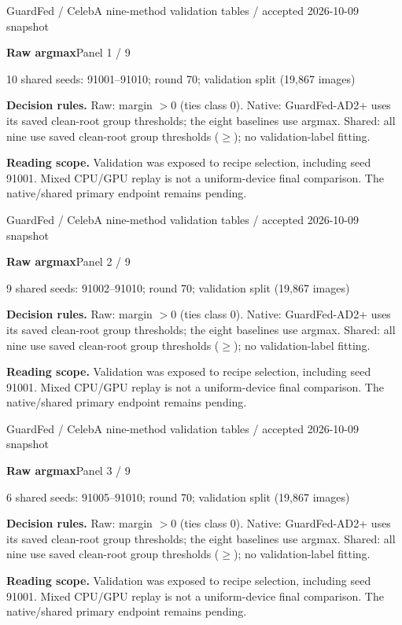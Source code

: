 \documentclass[11pt]{article}
\begin{document}
{\small GuardFed / CelebA nine-method validation tables / accepted 2026-10-09 snapshot}\par\medskip
{\LARGE\bfseries Raw argmax}\hfill{\large Panel 1 / 9}\par\smallskip
{\large 10 shared seeds: 91001--91010; round 70; validation split (19,867 images)}\par\medskip

\par\medskip
{\footnotesize\textbf{Decision rules.} Raw: margin $>0$ (ties class 0). Native: GuardFed-AD2+ uses its saved clean-root group thresholds; the eight baselines use argmax. Shared: all nine use saved clean-root group thresholds ($\geq$); no validation-label fitting.\par
\textbf{Reading scope.} Validation was exposed to recipe selection, including seed 91001. Mixed CPU/GPU replay is not a uniform-device final comparison. The native/shared primary endpoint remains pending.}

\newpage
{\small GuardFed / CelebA nine-method validation tables / accepted 2026-10-09 snapshot}\par\medskip
{\LARGE\bfseries Raw argmax}\hfill{\large Panel 2 / 9}\par\smallskip
{\large 9 shared seeds: 91002--91010; round 70; validation split (19,867 images)}\par\medskip

\par\medskip
{\footnotesize\textbf{Decision rules.} Raw: margin $>0$ (ties class 0). Native: GuardFed-AD2+ uses its saved clean-root group thresholds; the eight baselines use argmax. Shared: all nine use saved clean-root group thresholds ($\geq$); no validation-label fitting.\par
\textbf{Reading scope.} Validation was exposed to recipe selection, including seed 91001. Mixed CPU/GPU replay is not a uniform-device final comparison. The native/shared primary endpoint remains pending.}

\newpage
{\small GuardFed / CelebA nine-method validation tables / accepted 2026-10-09 snapshot}\par\medskip
{\LARGE\bfseries Raw argmax}\hfill{\large Panel 3 / 9}\par\smallskip
{\large 6 shared seeds: 91005--91010; round 70; validation split (19,867 images)}\par\medskip

\par\medskip
{\footnotesize\textbf{Decision rules.} Raw: margin $>0$ (ties class 0). Native: GuardFed-AD2+ uses its saved clean-root group thresholds; the eight baselines use argmax. Shared: all nine use saved clean-root group thresholds ($\geq$); no validation-label fitting.\par
\textbf{Reading scope.} Validation was exposed to recipe selection, including seed 91001. Mixed CPU/GPU replay is not a uniform-device final comparison. The native/shared primary endpoint remains pending.}
\end{document}
